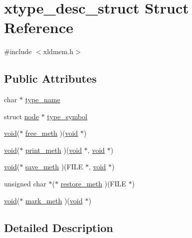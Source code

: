 \hypertarget{structxtype__desc__struct}{}\section{xtype\+\_\+desc\+\_\+struct Struct Reference}
\label{structxtype__desc__struct}


{\ttfamily \#include $<$xldmem.\+h$>$}

\subsection*{Public Attributes}
\begin{DoxyCompactItemize}
\item 
char $\ast$ \hyperlink{structxtype__desc__struct_a4d8c07f36fad3beddede142aa20d7051}{type\+\_\+name}
\item 
struct \hyperlink{structnode}{node} $\ast$ \hyperlink{structxtype__desc__struct_ab1ae78715eb721572b404dd2577aae50}{type\+\_\+symbol}
\item 
\hyperlink{sound_8c_ae35f5844602719cf66324f4de2a658b3}{void}($\ast$ \hyperlink{structxtype__desc__struct_af4b02eb08915eef7642227bbf5d04031}{free\+\_\+meth} )(\hyperlink{sound_8c_ae35f5844602719cf66324f4de2a658b3}{void} $\ast$)
\item 
\hyperlink{sound_8c_ae35f5844602719cf66324f4de2a658b3}{void}($\ast$ \hyperlink{structxtype__desc__struct_a0a33189e5a8b08ec235e2b2faad8db61}{print\+\_\+meth} )(\hyperlink{sound_8c_ae35f5844602719cf66324f4de2a658b3}{void} $\ast$, \hyperlink{sound_8c_ae35f5844602719cf66324f4de2a658b3}{void} $\ast$)
\item 
\hyperlink{sound_8c_ae35f5844602719cf66324f4de2a658b3}{void}($\ast$ \hyperlink{structxtype__desc__struct_a151b060e4c324981ff30fb9738fb5559}{save\+\_\+meth} )(F\+I\+LE $\ast$, \hyperlink{sound_8c_ae35f5844602719cf66324f4de2a658b3}{void} $\ast$)
\item 
unsigned char $\ast$($\ast$ \hyperlink{structxtype__desc__struct_a3282dd0e4b267fb5338d7c6084667e2b}{restore\+\_\+meth} )(F\+I\+LE $\ast$)
\item 
\hyperlink{sound_8c_ae35f5844602719cf66324f4de2a658b3}{void}($\ast$ \hyperlink{structxtype__desc__struct_ad2a148a69083b13dae6a20eec06f978f}{mark\+\_\+meth} )(\hyperlink{sound_8c_ae35f5844602719cf66324f4de2a658b3}{void} $\ast$)
\end{DoxyCompactItemize}


\subsection{Detailed Description}


